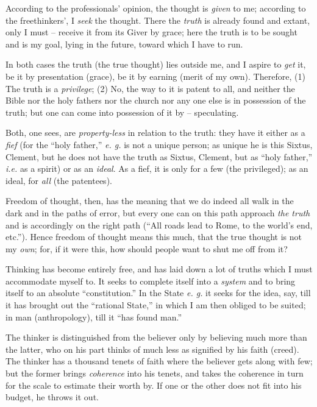 \documentclass[12pt,a4paper]{book}
\begin{document}
According to the professionals' opinion, the thought is \textit{given} to me; 
according to the freethinkers', I \textit{seek} the thought. There the 
\textit{truth} is already found and extant, only I must -- receive it from its 
Giver by grace; here the truth is to be sought and is my goal, lying in the 
future, toward which I have to run.

In both cases the truth (the true thought) lies outside me, and I aspire to 
\textit{get} it, be it by presentation (grace), be it by earning (merit of my 
own). Therefore, (1) The truth is a \textit{privilege}; (2) No, the way to it 
is patent to all, and neither the Bible nor the holy fathers nor the church 
nor any one else is in possession of the truth; but one can come into 
possession of it by -- speculating.

Both, one sees, are \textit{property-less} in relation to the truth: they have 
it either as a \textit{fief} (for the ``holy father,'' \textit{e. g.} is not 
a unique person; as unique he is this Sixtus, Clement, but he does not have 
the truth as Sixtus, Clement, but as ``holy father,'' \textit{i.e.} as a 
spirit) or as an \textit{ideal}. As a fief, it is only for a few (the 
privileged); as an ideal, for \textit{all} (the patentees).

Freedom of thought, then, has the meaning that we do indeed all walk in the 
dark and in the paths of error, but every one can on this path approach 
\textit{the truth} and is accordingly on the right path (``All roads lead to 
Rome, to the world's end, etc.''). Hence freedom of thought means this much, 
that the true thought is not my \textit{own}; for, if it were this, how should 
people want to shut me off from it?

Thinking has become entirely free, and has laid down a lot of truths which I 
must accommodate myself to. It seeks to complete itself into a \textit{system} 
and to bring itself to an absolute ``constitution.'' In the State \textit{e. 
g.} it seeks for the idea, say, till it has brought out the ``rational 
State,'' in which I am then obliged to be suited; in man (anthropology), till 
it ``has found man.''

The thinker is distinguished from the believer only by believing much more 
than the latter, who on his part thinks of much less as signified by his faith 
(creed). The thinker has a thousand tenets of faith where the believer gets 
along with few; but the former brings \textit{coherence} into his tenets, and 
takes the coherence in turn for the scale to estimate their worth by. If one 
or the other does not fit into his budget, he throws it out.
\end{document}
